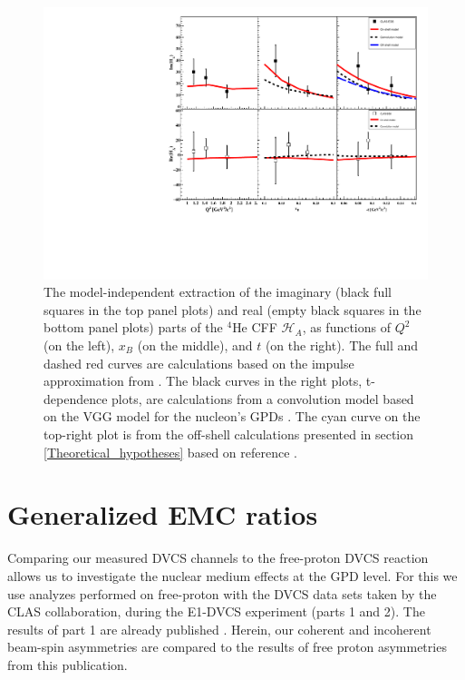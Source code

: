 \begin{figure}[h!]
\includegraphics[scale=0.9]{fig_Dec2016/Coherent_CFF.pdf}
\caption{The model-independent extraction of the imaginary (black full squares 
in the top panel plots) and real (empty black squares in the bottom panel 
plots) parts of the $^4$He CFF $\mathcal{H}_A$, as functions of $Q^{2}$ (on the 
left), $x_B$ (on the middle), and $t$ (on the right). The full and dashed red 
curves are calculations based on the impulse approximation from 
\cite{Vadim_priv}.  The black curves in the right plots, t-dependence plots, 
are calculations from a convolution model based on the VGG model for the 
nucleon's GPDs \cite{Guidal_priv}. The cyan curve on the top-right plot is from 
the off-shell calculations presented in section \ref{Theoretical_hypotheses} 
based on reference \cite{GonzalezHernandez:2012jv}.  }
\label{fig:HA_CFF}
\end{figure}


\section{Generalized EMC ratios} \label{sec:Generalized_EMC}
Comparing our measured DVCS channels to the free-proton DVCS reaction 
allows us to investigate the nuclear medium effects at the GPD level. For this 
we use analyzes performed on free-proton with the DVCS data sets taken by the CLAS 
collaboration, during the E1-DVCS experiment (parts 1 and 2). The results of 
part 1 are already published \cite{FX_BSA, CLAS_cross_section}. Herein, our 
coherent and incoherent beam-spin asymmetries are compared to the results of
free proton asymmetries from this publication.



